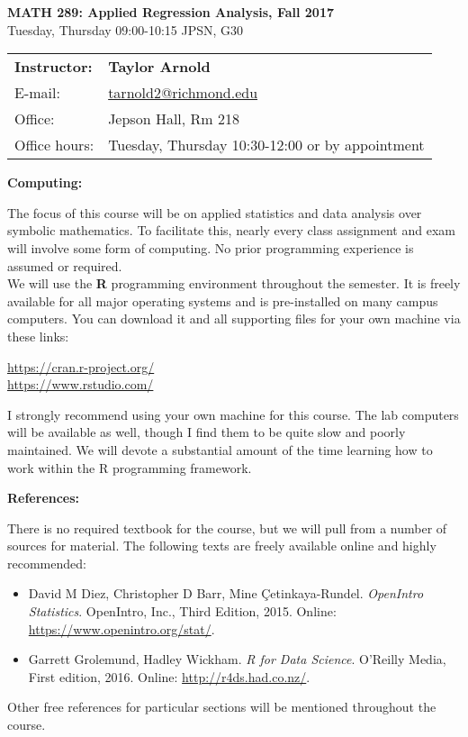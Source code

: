 \documentclass[12pt]{article}
\begin{document}
\begin{center}
{\bf MATH 289: Applied Regression Analysis, Fall 2017} \\
Tuesday, Thursday 09:00-10:15 \quad JPSN, G30\\
\end{center}

\bigskip

\noindent
\begin{tabular}{ l l }
{\bf Instructor:} &  {\bf Taylor Arnold} \\
E-mail: & \href{mailto:tarnold2@richmond.edu}{tarnold2@richmond.edu} \\
Office: & Jepson Hall, Rm 218 \\
Office hours: & Tuesday, Thursday 10:30-12:00 or by appointment
\end{tabular}

\vspace{0.5cm}

\textbf{Computing:} \vspace{6pt}

The focus of this course will be on applied statistics and data
analysis over symbolic mathematics. To facilitate this, nearly
every class assignment and exam will involve some form of
computing. No prior programming experience is assumed or
required. \\

We will use the \textbf{R} programming environment throughout the
semester. It is freely available for all major operating systems and
is pre-installed on many campus computers. You can download it and
all supporting files for your own machine via these links:
\begin{center}
\url{https://cran.r-project.org/} \\
\url{https://www.rstudio.com/}
\end{center}
I strongly recommend using your own machine for this course. The
lab computers will be available as well, though I find them to be
quite slow and poorly maintained. We will devote a substantial
amount of the time learning how to work within the R programming
framework.

\vspace{0.4cm}

\textbf{References:} \vspace{6pt}

There is no required textbook for the course, but we will pull
from a number of sources for material. The following texts are
freely available online and highly recommended:
\begin{itemize}\setlength\itemsep{0em}
\item David M Diez, Christopher D Barr, Mine Çetinkaya-Rundel.
  \textit{OpenIntro Statistics}. OpenIntro, Inc., Third Edition,
  2015. Online: \url{https://www.openintro.org/stat/}.
\item Garrett Grolemund, Hadley Wickham. \textit{R for Data Science}.
  O'Reilly Media, First edition, 2016. Online: \url{http://r4ds.had.co.nz/}.
\end{itemize}
Other free references for particular sections will be mentioned
throughout the course.
\end{document}
